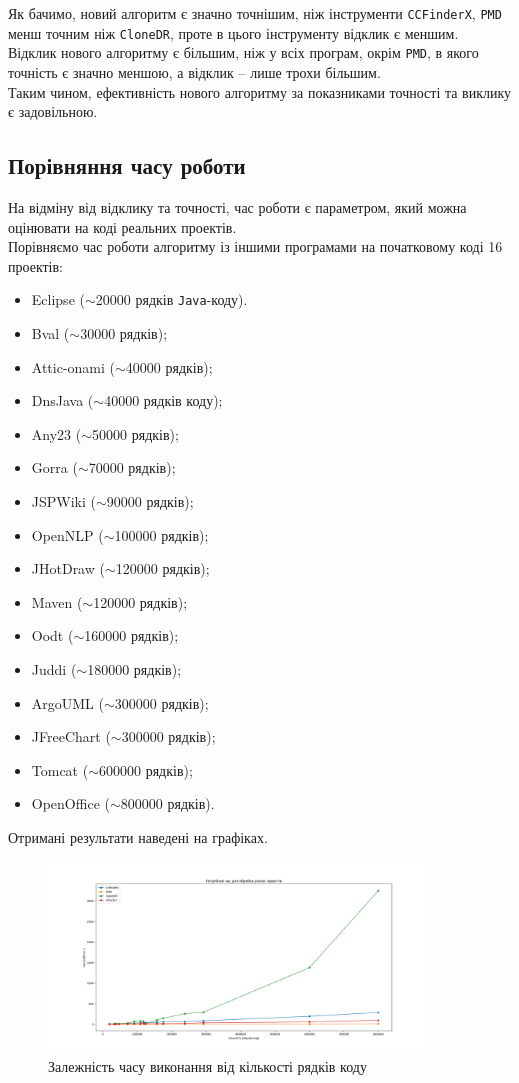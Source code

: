 \documentclass[a4paper, 14pt]{article}
\begin{document}
Як бачимо, новий алгоритм є значно точнішим, ніж інструменти \verb|CCFinderX|, \verb|PMD| менш точним ніж \verb|CloneDR|, проте в цього інструменту відклик є меншим. \\
Відклик нового алгоритму є більшим, ніж у всіх програм, окрім \verb|PMD|, в якого точність є значно меншою, а відклик -- лише трохи більшим. \\
Таким чином, ефективність нового алгоритму за показниками точності та виклику є задовільною.
\subsection{Порівняння часу роботи}
На відміну від відклику та точності, час роботи є параметром, який можна оцінювати на коді реальних проектів. \\
Порівняємо час роботи алгоритму із іншими програмами на початковому коді 16 проектів:
\begin{itemize}
\item Eclipse ($\sim$20000 рядків \verb|Java|-коду).
\item Bval ($\sim$30000 рядків);
\item Attic-onami ($\sim$40000 рядків);
\item DnsJava ($\sim$40000 рядків коду);
\item Any23 ($\sim$50000 рядків);
\item Gorra ($\sim$70000 рядків);
\item JSPWiki ($\sim$90000 рядків);
\item OpenNLP ($\sim$100000 рядків);
\item JHotDraw ($\sim$120000 рядків);
\item Maven ($\sim$120000 рядків);
\item Oodt ($\sim$160000 рядків);
\item Juddi ($\sim$180000 рядків);
\item ArgoUML ($\sim$300000 рядків);
\item JFreeChart ($\sim$300000 рядків);
\item Tomcat ($\sim$600000 рядків);
\item OpenOffice ($\sim$800000 рядків).
\end{itemize}
Отримані результати наведені на графіках. \\ \newpage
\begin{figure}[h]
    \centering
    \includegraphics[width=0.9\textwidth]{graph1}
		\caption{Залежність часу виконання від кількості рядків коду}
\end{figure} \hfill \\
\end{document}
